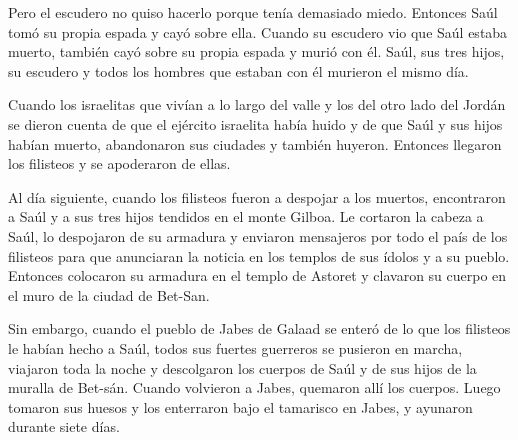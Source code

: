 Pero el escudero no quiso hacerlo porque tenía demasiado miedo. Entonces
Saúl tomó su propia espada y cayó sobre ella.  Cuando su
escudero vio que Saúl estaba muerto, también cayó sobre su propia espada
y murió con él.  Saúl, sus tres hijos, su escudero y todos
los hombres que estaban con él murieron el mismo día.

 Cuando los israelitas que vivían a lo largo del valle y los
del otro lado del Jordán se dieron cuenta de que el ejército israelita
había huido y de que Saúl y sus hijos habían muerto, abandonaron sus
ciudades y también huyeron. Entonces llegaron los filisteos y se
apoderaron de ellas.

 Al día siguiente, cuando los filisteos fueron a despojar a
los muertos, encontraron a Saúl y a sus tres hijos tendidos en el monte
Gilboa.  Le cortaron la cabeza a Saúl, lo despojaron de su
armadura y enviaron mensajeros por todo el país de los filisteos para
que anunciaran la noticia en los templos de sus ídolos y a su pueblo.
 Entonces colocaron su armadura en el templo de Astoret y
clavaron su cuerpo en el muro de la ciudad de Bet-San.

 Sin embargo, cuando el pueblo de Jabes de Galaad se enteró
de lo que los filisteos le habían hecho a Saúl,  todos sus
fuertes guerreros se pusieron en marcha, viajaron toda la noche y
descolgaron los cuerpos de Saúl y de sus hijos de la muralla de Bet-sán.
Cuando volvieron a Jabes, quemaron allí los cuerpos.  Luego
tomaron sus huesos y los enterraron bajo el tamarisco en Jabes, y
ayunaron durante siete días.
